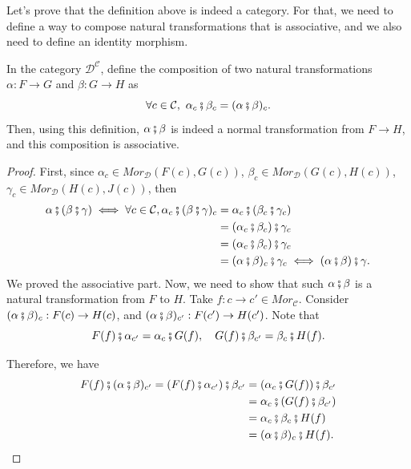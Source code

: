 Let's prove that the definition above is indeed a category.
For that, we need to define a way to compose natural transformations that
is associative, and we also need to define an identity morphism.

\begin{proposition}
	In the category $\mathcal D^{\mathcal C}$, define the composition of two natural
	transformations $\alpha:F\to G$ and $\beta:G\to H$ as
	\begin{displaymath}
		\forall c \in \mathcal C, \ \alpha_c \fatsemi \beta_c = (\alpha \fatsemi \beta)_c.
	\end{displaymath}
	Then, using this definition, $\alpha \fatsemi \beta$ is indeed a normal transformation
	from $F \to H$, and this composition is associative.
\end{proposition}
\begin{proof}
	First, since
	$\alpha_c \in Mor_\mathcal D (F(c),G(c))$,
	$\beta_c \in Mor_\mathcal D (G(c),H(c))$,
	$\gamma_c \in Mor_\mathcal D (H(c),J(c))$,
	then
	\begin{align*}
		\alpha \fatsemi (\beta \fatsemi \gamma) \iff
		\forall c \in \mathcal C, \alpha_c \fatsemi (\beta \fatsemi \gamma)_c & =
		\alpha_c \fatsemi (\beta_c \fatsemi \gamma_c)                             \\&=
		(\alpha_c \fatsemi \beta_c) \fatsemi \gamma_c                             \\&=
		(\alpha_c \fatsemi \beta_c) \fatsemi \gamma_c                             \\&=
		(\alpha \fatsemi \beta)_c \fatsemi \gamma_c
		\iff (\alpha \fatsemi \beta) \fatsemi \gamma.
	\end{align*}
	We proved the associative part. Now, we need to show that such $\alpha \fatsemi \beta$
	is a natural transformation from $F$ to $H$. Take $f:c\to c' \in Mor_\mathcal C$.
	Consider $(\alpha \fatsemi \beta)_{c}:F(c) \to H(c)$, and
	$(\alpha\fatsemi \beta)_{c'}:F(c') \to H(c')$. Note that
	\begin{displaymath}
		F(f) \fatsemi \alpha_{c'} = \alpha_{c} \fatsemi G(f), \quad
		G(f) \fatsemi \beta_{c'} = \beta_{c} \fatsemi H(f).
	\end{displaymath}

	Therefore, we have
	\begin{align*}
		F(f) \fatsemi (\alpha\fatsemi \beta)_{c'} =
		(F(f) \fatsemi \alpha_{c'}) \fatsemi \beta_{c'} & =
		(\alpha_c \fatsemi G(f)) \fatsemi \beta_{c'}        \\&=
		\alpha_c \fatsemi (G(f) \fatsemi \beta_{c'})        \\&=
		\alpha_c \fatsemi \beta_c \fatsemi H(f)             \\&=
		(\alpha \fatsemi \beta)_c \fatsemi H(f).
	\end{align*}
\end{proof}


